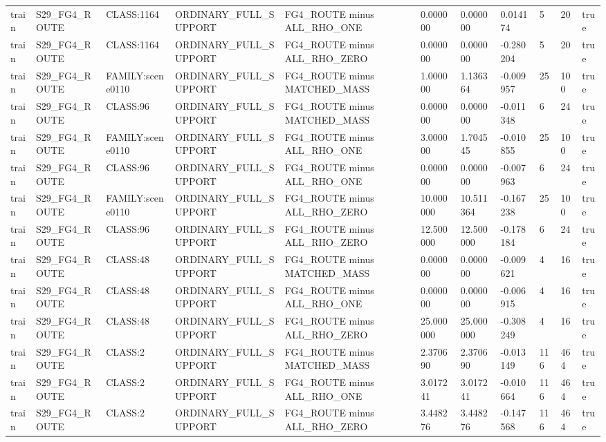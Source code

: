 \begin{tabular}{lllllllllll}
train & S29\_FG4\_ROUTE & CLASS:1164 & ORDINARY\_FULL\_SUPPORT & FG4\_ROUTE minus ALL\_RHO\_ONE & 0.000000 & 0.000000 & 0.014174 & 5 & 20 & true \\
train & S29\_FG4\_ROUTE & CLASS:1164 & ORDINARY\_FULL\_SUPPORT & FG4\_ROUTE minus ALL\_RHO\_ZERO & 0.000000 & 0.000000 & -0.280204 & 5 & 20 & true \\
train & S29\_FG4\_ROUTE & FAMILY:scene0110 & ORDINARY\_FULL\_SUPPORT & FG4\_ROUTE minus MATCHED\_MASS & 1.000000 & 1.136364 & -0.009957 & 25 & 100 & true \\
train & S29\_FG4\_ROUTE & CLASS:96 & ORDINARY\_FULL\_SUPPORT & FG4\_ROUTE minus MATCHED\_MASS & 0.000000 & 0.000000 & -0.011348 & 6 & 24 & true \\
train & S29\_FG4\_ROUTE & FAMILY:scene0110 & ORDINARY\_FULL\_SUPPORT & FG4\_ROUTE minus ALL\_RHO\_ONE & 3.000000 & 1.704545 & -0.010855 & 25 & 100 & true \\
train & S29\_FG4\_ROUTE & CLASS:96 & ORDINARY\_FULL\_SUPPORT & FG4\_ROUTE minus ALL\_RHO\_ONE & 0.000000 & 0.000000 & -0.007963 & 6 & 24 & true \\
train & S29\_FG4\_ROUTE & FAMILY:scene0110 & ORDINARY\_FULL\_SUPPORT & FG4\_ROUTE minus ALL\_RHO\_ZERO & 10.000000 & 10.511364 & -0.167238 & 25 & 100 & true \\
train & S29\_FG4\_ROUTE & CLASS:96 & ORDINARY\_FULL\_SUPPORT & FG4\_ROUTE minus ALL\_RHO\_ZERO & 12.500000 & 12.500000 & -0.178184 & 6 & 24 & true \\
train & S29\_FG4\_ROUTE & CLASS:48 & ORDINARY\_FULL\_SUPPORT & FG4\_ROUTE minus MATCHED\_MASS & 0.000000 & 0.000000 & -0.009621 & 4 & 16 & true \\
train & S29\_FG4\_ROUTE & CLASS:48 & ORDINARY\_FULL\_SUPPORT & FG4\_ROUTE minus ALL\_RHO\_ONE & 0.000000 & 0.000000 & -0.006915 & 4 & 16 & true \\
train & S29\_FG4\_ROUTE & CLASS:48 & ORDINARY\_FULL\_SUPPORT & FG4\_ROUTE minus ALL\_RHO\_ZERO & 25.000000 & 25.000000 & -0.308249 & 4 & 16 & true \\
train & S29\_FG4\_ROUTE & CLASS:2 & ORDINARY\_FULL\_SUPPORT & FG4\_ROUTE minus MATCHED\_MASS & 2.370690 & 2.370690 & -0.013149 & 116 & 464 & true \\
train & S29\_FG4\_ROUTE & CLASS:2 & ORDINARY\_FULL\_SUPPORT & FG4\_ROUTE minus ALL\_RHO\_ONE & 3.017241 & 3.017241 & -0.010664 & 116 & 464 & true \\
train & S29\_FG4\_ROUTE & CLASS:2 & ORDINARY\_FULL\_SUPPORT & FG4\_ROUTE minus ALL\_RHO\_ZERO & 3.448276 & 3.448276 & -0.147568 & 116 & 464 & true \\

\end{tabular}
